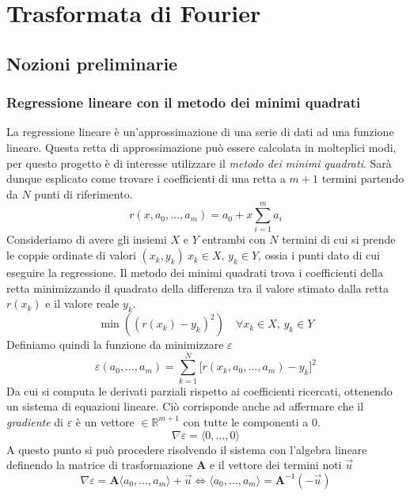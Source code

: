\chapter{Trasformata di Fourier}

\section{Nozioni preliminarie}

\subsection{Regressione lineare con il metodo dei minimi quadrati}
La regressione lineare \`e un'approssimazione di una serie di dati ad una
funzione lineare. Questa retta di approssimazione pu\`o essere calcolata in
molteplici modi, per questo progetto \`e di interesse utilizzare il
\emph{metodo dei minimi quadrati}.  Sar\`a dunque esplicato come trovare i
coefficienti di una retta a \(m+1\) termini partendo da \(N\) punti di
riferimento.
\begin{equation}
    r(x, a_0, \dots, a_m) = a_0 + x\sum_{i=1}^{m}a_i
\end{equation}
Consideriamo di avere gli insiemi \(X\) e \(Y\) entrambi con \(N\) termini di
cui si prende le coppie ordinate di valori \((x_k, y_k)~ x_k\in X,\,y_k\in
Y\), ossia i punti dato di cui eseguire la regressione.  Il metodo dei minimi
quadrati trova i coefficienti della retta minimizzando il quadrato della
differenza tra il valore stimato dalla retta \(r(x_k)\) e il valore reale
\(y_k\).
\begin{equation*}
    \min((r(x_k) - y_k)^2)\quad \forall x_k\in X,\, y_k\in Y
\end{equation*}
Definiamo quindi la funzione da minimizzare \(\varepsilon\)
\begin{equation}
    \varepsilon(a_0, \dots, a_m) = \sum_{k=1}^{N}\Big[r(x_k, a_0, \dots, a_m)  - y_k\Big]^2
\end{equation}
Da cui si computa le derivati parziali rispetto ai coefficienti ricercati,
ottenendo un sistema di equazioni lineare. Ci\`o corrisponde anche ad
affermare che il \emph{gradiente} di \(\varepsilon\) \`e un vettore
\(\in\mathbb{R}^{m+1}\) con tutte le componenti a 0.
\begin{equation*}
    \nabla\varepsilon = \langle 0, \dots, 0 \rangle
\end{equation*}
A questo punto si pu\`o procedere risolvendo il sistema con l'algebra lineare
definendo la matrice di trasformazione \(\mathbf{A}\) e il vettore dei termini
noti \(\vec{u}\)
\begin{equation*}
    \nabla \varepsilon = \mathbf{A}
        \langle a_0, \dots,  a_m \rangle + \vec{u} \iff
    \langle a_0, \dots, a_m \rangle =
        \mathbf{A}^{-1}(-\vec{u})
\end{equation*}

